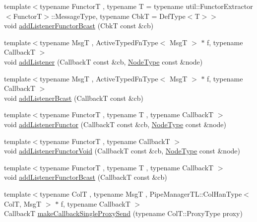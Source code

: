 \begin{DoxyCompactItemize}
\item 
{\footnotesize template$<$typename FunctorT , typename T  = typename util\+::\+Functor\+Extractor$<$\+Functor\+T$>$\+::\+Message\+Type, typename CbkT  = Def\+Type$<$\+T$>$$>$ }\\void \hyperlink{structvt_1_1pipe_1_1_pipe_manager_t_l_a3bbcc3d70bb6840ede74747011f18ea8}{add\+Listener\+Functor\+Bcast} (CbkT const \&cb)
\item 
{\footnotesize template$<$typename MsgT , Active\+Typed\+Fn\+Type$<$ Msg\+T $>$ $\ast$ f, typename CallbackT $>$ }\\void \hyperlink{structvt_1_1pipe_1_1_pipe_manager_t_l_ae1aee468ba813cc359e3d3602722b161}{add\+Listener} (CallbackT const \&cb, \hyperlink{namespacevt_a866da9d0efc19c0a1ce79e9e492f47e2}{Node\+Type} const \&node)
\item 
{\footnotesize template$<$typename MsgT , Active\+Typed\+Fn\+Type$<$ Msg\+T $>$ $\ast$ f, typename CallbackT $>$ }\\void \hyperlink{structvt_1_1pipe_1_1_pipe_manager_t_l_af50d2867536e0b9db56560126c3da066}{add\+Listener\+Bcast} (CallbackT const \&cb)
\item 
{\footnotesize template$<$typename FunctorT , typename T , typename CallbackT $>$ }\\void \hyperlink{structvt_1_1pipe_1_1_pipe_manager_t_l_aca69c630748b177c01af61b39ffad0ec}{add\+Listener\+Functor} (CallbackT const \&cb, \hyperlink{namespacevt_a866da9d0efc19c0a1ce79e9e492f47e2}{Node\+Type} const \&node)
\item 
{\footnotesize template$<$typename FunctorT , typename CallbackT $>$ }\\void \hyperlink{structvt_1_1pipe_1_1_pipe_manager_t_l_a12039964ec1deb173f0ee83ad4c8a543}{add\+Listener\+Functor\+Void} (CallbackT const \&cb, \hyperlink{namespacevt_a866da9d0efc19c0a1ce79e9e492f47e2}{Node\+Type} const \&node)
\item 
{\footnotesize template$<$typename FunctorT , typename T , typename CallbackT $>$ }\\void \hyperlink{structvt_1_1pipe_1_1_pipe_manager_t_l_a7f59d9749248fb963a7c279a053fe220}{add\+Listener\+Functor\+Bcast} (CallbackT const \&cb)
\item 
{\footnotesize template$<$typename ColT , typename MsgT , Pipe\+Manager\+T\+L\+::\+Col\+Han\+Type$<$ Col\+T, Msg\+T $>$ $\ast$ f, typename CallbackT $>$ }\\CallbackT \hyperlink{structvt_1_1pipe_1_1_pipe_manager_t_l_a0da1b385495f0a625754f17db45a4066}{make\+Callback\+Single\+Proxy\+Send} (typename Col\+T\+::\+Proxy\+Type proxy)

\end{DoxyCompactItemize}
